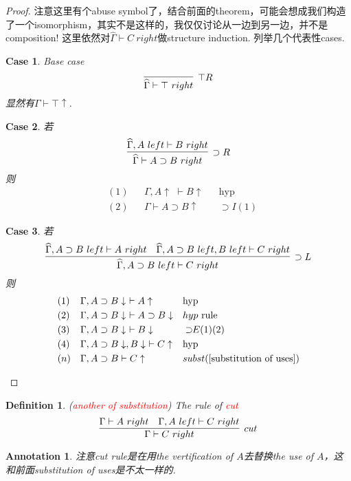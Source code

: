 \documentclass{article}
\theoremstyle{plain}
\newtheorem{definition}[theorem]{Definition}
\newtheorem{annotation}[theorem]{Annotation}
\newtheorem{case}{Case}
\theoremstyle{nonumberplain}
\newtheorem{proof}{Proof}
\newcommand{\redt}[1]{\textcolor{red}{#1}}
\begin{document}
\begin{proof}
\rm 注意这里有个abuse symbol了，结合前面的theorem，可能会想成我们构造了一个isomorphism，其实不是这样的，我仅仅讨论从一边到另一边，并不是composition! 这里依然对$\widehat{\Gamma} \vdash C~right$做structure induction. 列举几个代表性cases.
\begin{case} Base case
$$
\infer[\top R]{\widehat{\Gamma} \vdash \top~right}{}
$$
显然有$\Gamma \vdash \top \uparrow$.
\end{case}
\begin{case}若
$$
\infer[\supset R]{\widehat{\Gamma} \vdash A \supset B~right}{\widehat{\Gamma}, A~left \vdash B~right}
$$
则
$$
\begin{aligned}
&(1) && \Gamma,A \uparrow\,\, \vdash B \uparrow && \text{hyp} \\
&(2) && \Gamma \vdash A \supset B \uparrow && \supset I(1)
\end{aligned}
$$
\end{case}
\begin{case} 若
$$
\infer[\supset L]{\widehat{\Gamma}, A \supset B~left \vdash C~right}{\widehat{\Gamma}, A \supset B~left \vdash A~right & \widehat{\Gamma}, A \supset B~left, B~left \vdash C~right}
$$
则
$$
\begin{aligned}
&(1) && \Gamma, A \supset B \downarrow\,\, \vdash A \uparrow && \text{hyp} \\
&(2) && \Gamma, A \supset B \downarrow\,\, \vdash A \supset B \downarrow && hyp~\text{rule} \\
&(3) && \Gamma, A \supset B \downarrow\,\, \vdash B \downarrow && \supset\!\! E(1)(2) \\
&(4) && \Gamma, A \supset B \downarrow, B \downarrow\,\, \vdash C \uparrow && \text{hyp}\\
&(n) &&\Gamma, A \supset B \vdash C \uparrow  && subst(\ref{substitution of uses})
\end{aligned}
$$
\end{case}

\end{proof}

\begin{definition}
\rm (\redt{another of substitution}) The rule of \redt{cut}
$$
\infer[cut]{\Gamma \vdash C~right}{\Gamma \vdash A~right & \Gamma, A~left \vdash C~right}
$$
\end{definition}

\begin{annotation}
\rm 注意\emph{cut} rule是在用the vertification of $A$去替换the use of $A$，这和前面substitution of uses是不太一样的. 
\end{annotation}
\end{document}

